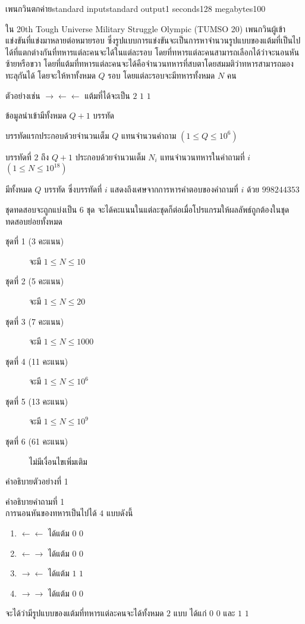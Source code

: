 \documentclass[11pt,a4paper]{article}
\begin{document}
\begin{problem}{เพนกวินตกค่าย}{standard input}{standard output}{1 seconds}{128 megabytes}{100}


ใน 20th Tough Universe Military Struggle Olympic (TUMSO 20) เพนกวินผู้เข้าแข่งขันที่แข่งมาหลายต่อหมายรอบ ซึ่งรูปแบบการแข่งขันจะเป็นการหาจำนวนรูปแบบของแต้มที่เป็นไปได้ที่แตกต่างกันที่ทหารแต่ละคนจะได้ในแต่ละรอบ โดยที่ทหารแต่ละคนสามารถเลือกได้ว่าจะนอนหันซ้ายหรือขวา โดยที่แต้มที่ทหารแต่ละคนจะได้คือจำนวนทหารที่สบตาโดยสมมติว่าทหารสามารถมองทะลุกันได้ โดยจะให้หาทั้งหมด $Q$ รอบ โดยแต่ละรอบจะมีทหารทั้งหมด $N$ คน

ตัวอย่างเช่น $\rightarrow\leftarrow\leftarrow$ แต้มที่ได้จะเป็น $2$ $1$ $1$

\InputFile
ข้อมูลนำเข้ามีทั้งหมด $Q+1$ บรรทัด

บรรทัดแรกประกอบด้วยจำนวนเต็ม $Q$ แทนจำนวนคำถาม $(1\leq Q\leq 10^{6})$

บรรทัดที่ $2$ ถึง $Q+1$ ประกอบด้วยจำนวนเต็ม $N_i$ แทนจำนวนทหารในคำถามที่ $i$ $(1\leq N\leq 10^{18})$

\OutputFile
มีทั้งหมด $Q$ บรรทัด ซึ่งบรรทัดที่ $i$ แสดงถึงเศษจากการหารคำตอบของคำถามที่ $i$ ด้วย $998244353$

\Scoring
ชุดทดสอบจะถูกแบ่งเป็น 6 ชุด จะได้คะแนนในแต่ละชุดก็ต่อเมื่อโปรแกรมให้ผลลัพธ์ถูกต้องในชุดทดสอบย่อยทั้งหมด

\begin{description}

\item[ชุดที่ 1 (3 คะแนน)] จะมี $1\leq N\leq 10$
\item[ชุดที่ 2 (5 คะแนน)] จะมี $1\leq N\leq 20$
\item[ชุดที่ 3 (7 คะแนน)] จะมี $1\leq N\leq 1000$
\item[ชุดที่ 4 (11 คะแนน)] จะมี $1\leq N\leq 10^6$
\item[ชุดที่ 5 (13 คะแนน)] จะมี $1\leq N\leq 10^9$
\item[ชุดที่ 6 (61 คะแนน)] ไม่มีเงื่อนไขเพิ่มเติม 

\end{description}

\Examples

\begin{example}
%
\end{example}

\Note

คำอธิบายตัวอย่างที่ 1

คำอธิบายคำถามที่ 1 \\
การนอนหันของทหารเป็นไปได้ $4$ แบบดังนี้
\begin{enumerate}
    \item $\leftarrow\leftarrow$ ได้แต้ม $0$ $0$
    \item $\leftarrow\rightarrow$ ได้แต้ม $0$ $0$
    \item $\rightarrow\leftarrow$ ได้แต้ม $1$ $1$
    \item $\rightarrow\rightarrow$ ได้แต้ม $0$ $0$ 
\end{enumerate}
จะได้ว่ามีรูปแบบของแต้มที่ทหารแต่ละคนจะได้ทั้งหมด $2$ แบบ ได้แก่ $0$ $0$ และ $1$ $1$


\end{problem}
\end{document}
